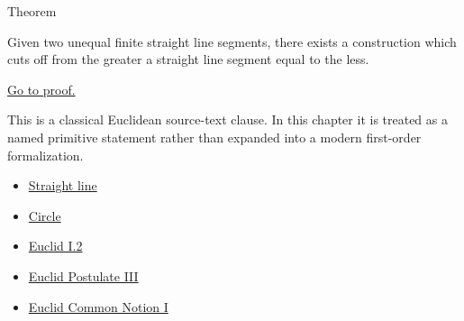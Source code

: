 \begin{theorembox}{Theorem}
\begin{theorem}
\label{thm:euclid-i-3}
Given two unequal finite straight line segments, there exists a construction
which cuts off from the greater a straight line segment equal to the less.
\end{theorem}
\end{theorembox}
\begin{remark*}[Proof]
\hyperref[prf:euclid-i-3]{Go to proof.}
\end{remark*}
\begin{remark*}
This is a classical Euclidean source-text clause. In this chapter it is treated
as a named primitive statement rather than expanded into a modern first-order
formalization.
\end{remark*}
\begin{lra-not-visible}
\begin{dependencies}
\begin{itemize}
  \item \hyperref[def:euclid-straight-line]{Straight line}
  \item \hyperref[def:euclid-circle]{Circle}
  \item \hyperref[thm:euclid-i-2]{Euclid I.2}
  \item \hyperref[ax:euclid-postulate-describe-circle]{Euclid Postulate III}
  \item \hyperref[ax:euclid-common-notion-things-equal-to-same]{Euclid Common Notion I}
\end{itemize}
\end{dependencies}
\end{lra-not-visible}
